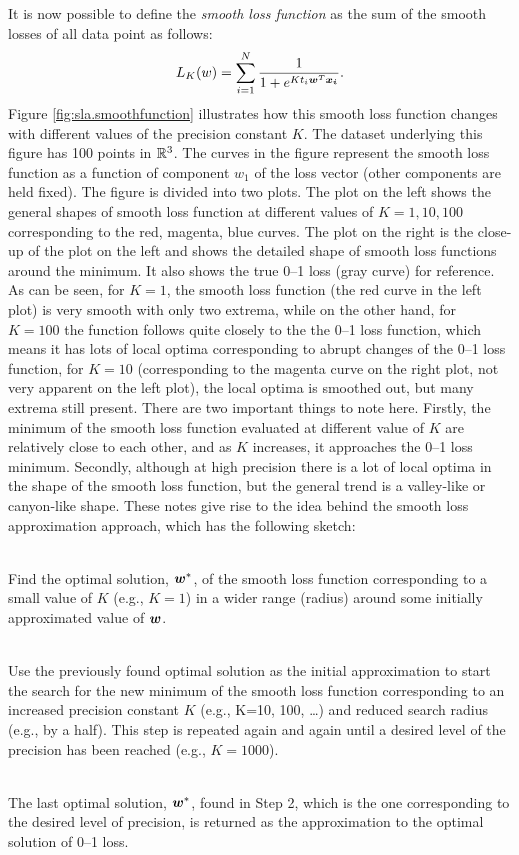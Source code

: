It is now possible to define the \emph{smooth loss function} as the sum of the smooth losses of all data point as follows:
$$L_K(w) = \sum_{i=1}^N \frac{1}{1 + e^{Kt_i \boldsymbol{w}^T \boldsymbol{x_i} }}.$$
Figure \ref{fig:sla.smoothfunction} illustrates how this smooth loss function changes with different values of the precision constant $K$. The dataset underlying this figure has 100 points in $\mathbb{R}^3$. The curves in the figure represent the smooth loss function as a function of  component $w_1$ of the loss vector (other components are held fixed). The figure is divided into two plots. The plot on the left shows the general shapes of smooth loss function at different values of $K=1, 10, 100$ corresponding to the red, magenta, blue curves. The plot on the right is the close-up of the plot on the left and shows the detailed shape of smooth loss functions around the minimum. It also shows the true 0--1 loss (gray curve) for reference. As can be seen, for $K=1$, the smooth loss function (the red curve in the left plot) is very smooth with only two extrema, while on the other hand, for $K=100$ the function follows quite closely to the the 0--1 loss function, which means it has lots of local optima corresponding to abrupt changes of the 0--1 loss function, for $K=10$ (corresponding to the magenta curve on the right plot, not very apparent on the left plot), the local optima is smoothed out, but many extrema still present. There are two important things to note here. Firstly, the minimum of the smooth loss function evaluated at different value of $K$ are relatively close to each other, and as $K$ increases, it approaches the 0--1 loss minimum. Secondly, although at high precision there is a lot of local optima in the shape of the smooth loss function, but the general trend is a valley-like or canyon-like shape. These notes give rise to the idea behind the smooth loss approximation approach, which has the following sketch:  

\begin{description}
\setlength{\itemsep}{0cm}
\setlength{\parskip}{0cm}
\item[Step 1:] \hfill \\ Find the optimal solution, $\boldsymbol{w}^*$, of the smooth loss function corresponding to a small value of $K$ (e.g., $K=1$) in a wider range (radius) around some initially approximated value of $\boldsymbol{w}$. 
\item[Step 2:] \hfill \\ Use the previously found optimal solution as the initial approximation to start the search for the new minimum of the smooth loss function corresponding to an increased precision constant $K$ (e.g., K=10, 100, \dots) and reduced search radius (e.g., by a half). This step is repeated again and again until a desired level of the precision has been reached (e.g., $K=1000$). 
\item[Step 3:] \hfill \\ The last optimal solution, $\boldsymbol{w}^*$, found in Step 2, which is the one corresponding to the desired level of precision, is returned as the approximation to the optimal solution of 0--1 loss. 
\end{description}

